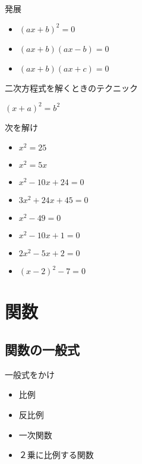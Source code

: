 \documentclass[10pt]{jsarticle}
\begin{document}
\begin{itembox}[l]{発展}
	\begin{Large}
		\begin{multicols}{2}
			\begin{itemize}
				\item $(ax+b)^2=0$
				\item $(ax+b)(ax-b)=0$
				\item $(ax+b)(ax+c)=0$
			\end{itemize}
		\end{multicols}
	\end{Large}
\end{itembox}

\begin{itembox}[l]{二次方程式を解くときのテクニック}
	\begin{Large}
		$(x+a)^2=b^2$
	\end{Large}
\end{itembox}

\begin{itembox}[l]{次を解け}
	\begin{Large}
		\begin{multicols}{2}
			\begin{itemize}
				\item $x^2=25$
				\item $x^2=5x$
				\item $x^2-10x+24=0$
				\item $3x^2+24x+45=0$
				\item $x^2-49=0$
				\item $x^2-10x+1=0$
				\item $2x^2-5x+2=0$
				\item $(x-2)^2-7=0$
			\end{itemize}
		\end{multicols}
	\end{Large}
\end{itembox}


\newpage

\section{関数}
\subsection{関数の一般式}
\begin{itembox}[l]{一般式をかけ}
	\begin{multicols}{2}
		\begin{itemize}
			\item 比例
			\item 反比例
			\item 一次関数
			\item ２乗に比例する関数
		\end{itemize}
	\end{multicols}
\end{itembox}
\end{document}
